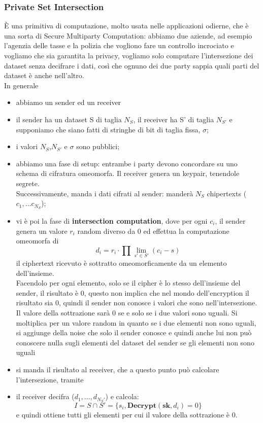 \documentclass[12pt, oneside]{extbook} %
\begin{document}
\subsubsection{Private Set Intersection}
È una primitiva di computazione, molto usata nelle applicazioni odierne, che è una sorta di Secure Multiparty Computation: abbiamo due aziende, ad esempio l'agenzia delle tasse e la polizia che vogliono fare un controllo incrociato e vogliamo che sia garantita la privacy, vogliamo solo computare l'intersezione dei dataset senza decifrare i dati, così che ognuno dei due party sappia quali parti del dataset è anche nell'altro.\\In generale
\begin{itemize}
	\item abbiamo un sender ed un receiver
	\item il sender ha un dataset S di taglia $N_S$, il receiver ha S' di taglia $N_{S'}$ e supponiamo che siano fatti di stringhe di bit di taglia fissa, $\sigma$;
	\item i valori $N_S$,$N_{S'}$ e $\sigma$ sono pubblici;
	\item abbiamo una fase di setup: entrambe i party devono concordare su uno schema di cifratura omeomorfa. Il receiver genera un keypair, tenendole segrete.\\ Successivamente, manda i dati cifrati al sender: manderà $N_S$ chipertexts ($c_1,...c_{N_S}$);
	\item vi è poi la fase di \textbf{intersection computation}, dove per ogni $c_i$, il sender genera un valore $r_i$ random diverso da 0 ed effettua la computazione omeomorfa di
	\begin{equation}
		d_i = r_i \cdot \prod\lim\limits_{s' \in S'} (c_i - s)
	\end{equation}
	il ciphertext ricevuto è sottratto omeomorficamente da un elemento dell'insieme.\\Facendolo per ogni elemento, solo se il cipher è lo stesso dell'insieme del sender, il risultato è 0, questo non implica che nel mondo dell'encryption il risultato sia 0, quindi il sender non conosce i valori che sono nell'intersezione. Il valore della sottrazione sarà 0 se e solo se i due valori sono uguali. Si moltiplica per un valore random in quanto se i due elementi non sono uguali, si aggiunge della noise che solo il sender conosce e quindi anche lui non può conoscere nulla sugli elementi del dataset del sender se gli elementi non sono uguali
	\item si manda il risultato al receiver, che a questo punto può calcolare l'intersezione, tramite 
	\item il receiver decifra ($d_1, ...,d_{N_S'}$) e calcola:
	\begin{equation}
		I = S \cap S' = \{s_i, \textbf{Decrypt}(\textbf{sk}, d_i) = 0\}
	\end{equation}
	e quindi ottiene tutti gli elementi per cui il valore della sottrazione è 0.
\end{itemize}
\end{document}
